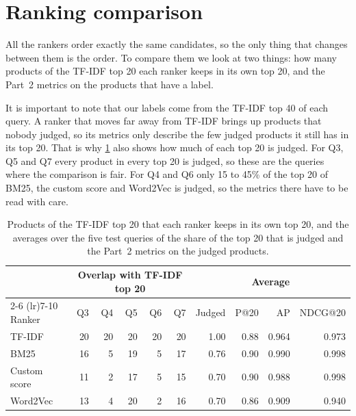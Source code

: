 \documentclass[11pt,a4paper]{article}
\begin{document}
\clearpage

\section{Ranking comparison}

All the rankers order exactly the same candidates, so the only thing that changes between them is the order. To compare them we look at two things: how many products of the TF-IDF top 20 each ranker keeps in its own top 20, and the Part~2 metrics on the products that have a label.

It is important to note that our labels come from the TF-IDF top 40 of each query. A ranker that moves far away from TF-IDF brings up products that nobody judged, so its metrics only describe the few judged products it still has in its top 20. That is why \cref{tab:rankers} also shows how much of each top 20 is judged. For Q3, Q5 and Q7 every product in every top 20 is judged, so these are the queries where the comparison is fair. For Q4 and Q6 only 15 to 45\% of the top 20 of BM25, the custom score and Word2Vec is judged, so the metrics there have to be read with care.

\begin{table}[htbp]
  \centering
  \small
  \caption{Products of the TF-IDF top 20 that each ranker keeps in its own top 20,
  and the averages over the five test queries of the share of the top 20 that is
  judged and the Part~2 metrics on the judged products.}
  \label{tab:rankers}
  \begin{tabular}{lrrrrrrrrr}
    \toprule
    & \multicolumn{5}{c}{Overlap with TF-IDF top 20} & \multicolumn{4}{c}{Average} \\
    \cmidrule(lr){2-6} \cmidrule(lr){7-10}
    Ranker & Q3 & Q4 & Q5 & Q6 & Q7 & Judged & P@20 & AP & NDCG@20 \\
    \midrule
    TF-IDF & 20 & 20 & 20 & 20 & 20 & 1.00 & 0.88 & 0.964 & 0.973 \\
    BM25 & 16 & 5 & 19 & 5 & 17 & 0.76 & 0.90 & 0.990 & 0.998 \\
    Custom score & 11 & 2 & 17 & 5 & 15 & 0.70 & 0.90 & 0.988 & 0.998 \\
    Word2Vec & 13 & 4 & 20 & 2 & 16 & 0.70 & 0.86 & 0.909 & 0.940 \\
    \bottomrule
  \end{tabular}
\end{table}
\end{document}
